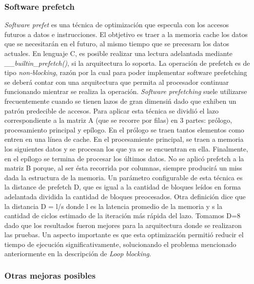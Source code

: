 \documentclass[a4paper,10pt]{article}
\begin{document}
\subsubsection*{Software prefetch}
\textit{Software prefet} es una t\'ecnica de optimizaci\'on que especula con los accesos futuros a datos e instrucciones. El obtjetivo es traer a la memoria cache los datos que 
se necesitar\'an en el futuro, al mismo tiempo que se precesarn los datos actuales. En lenguaje C, es posible realizar una lectura
adelantada mediante \textit{\_\_builtin\_prefetch()}, si la arquitectura lo soporta. 
La operaci\'on de prefetch es de tipo \textit{non-blocking}, raz\'on por la cual para poder implementar software prefetching se deber\'a contar con una arquitectura 
que permita al procesador continuar funcionando mientrar se realiza la operaci\'on. 
\textit{Software prefetching} suele utilizarse frecuentemente cuando se tienen lazos de gran dimensi\'n dado que exhiben un patr\'on predecible de accesos.
Para aplicar esta t\'ecnica se dividi\'o el lazo correspondiente a la matriz A (que se recorre por filas) en 3 partes: pr\'ologo, procesamiento principal y ep\'ilogo. En el pr\'ologo se 
traen tantos elementos como entren en una l\'inea de cache. En el procesamiente principal, se traen a memoria los siguientes datos y se procesan los que ya se se encuentran en ella. 
Finalmente, en el ep\'ilogo se termina de procesar los \'ultimos datos. No se aplic\'o prefetch a la matriz B porque, al ser \'esta recorrida por columnas, siempre producir\'a un miss dada la estructura de la memoria.
Un par\'ametro configurable de esta t\'ecnica es la distance de prefetch D, que es igual a la cantidad de bloques le\'idos en forma adelantada dividida la cantidad de bloques preocesados. Otra definici\'on 
dice que la distancia D = l/s donde l es la latencia promedio de la memoria y s la cantidad de ciclos estimado de la iteraci\'on m\'as r\'apida del lazo.
Tomamos D=8 dado que los resultados fueron mejores para la arquitectura donde se realizaron las pruebas. Un aspecto importante es que esta optimizaci\'on permiti\'o reducir el tiempo de 
ejecuci\'on significativamente, solucionando el problema mencionado anteriormente en la descripci\'on de \textit{Loop blocking}.






\subsubsection*{Otras mejoras posibles}
\end{document}
